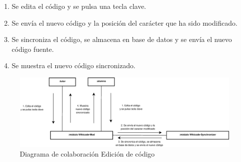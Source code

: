 \begin{enumerate}
	\item Se edita el código y se pulsa una tecla clave.
	\item Se envía el nuevo código y la posición del carácter que ha sido modificado.
	\item Se sincroniza el código, se almacena en base de datos y se envía el nuevo código fuente.
	\item Se muestra el nuevo código sincronizado.
\end{enumerate}

\begin{figure}[h]
	\centering
	\includegraphics[width=\textwidth]{./img/c3-dia-col4.eps}
	\caption{Diagrama de colaboración Edición de código}
\end{figure}




































